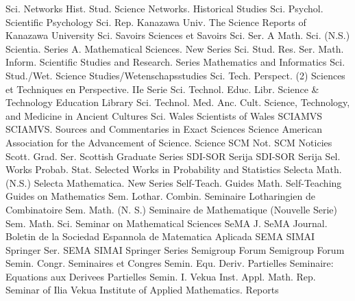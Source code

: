 {Sci. Networks Hist. Stud.}
{Science Networks. Historical Studies}
{Sci. Psychol.}
{Scientific Psychology}
{Sci. Rep. Kanazawa Univ.}
{The Science Reports of Kanazawa University}
{Sci. Savoirs}
{Sciences et Savoirs}
{Sci. Ser. A Math. Sci. (N.S.)}
{Scientia. Series A. Mathematical Sciences. New Series}
{Sci. Stud. Res. Ser. Math. Inform.}
{Scientific Studies and Research. Series Mathematics and Informatics}
{Sci. Stud./Wet.}
{Science Studies/Wetenschapsstudies}
{Sci. Tech. Perspect. (2)}
{Sciences et Techniques en Perspective. IIe Serie}
{Sci. Technol. Educ. Libr.}
{Science & Technology Education Library}
{Sci. Technol. Med. Anc. Cult.}
{Science, Technology, and Medicine in Ancient Cultures}
{Sci. Wales}
{Scientists of Wales}
{SCIAMVS}
{SCIAMVS. Sources and Commentaries in Exact Sciences}
{Science}
{American Association for the Advancement of Science. Science}
{SCM Not.}
{SCM Noticies}
{Scott. Grad. Ser.}
{Scottish Graduate Series}
{SDI-SOR Serija}
{SDI-SOR Serija}
{Sel. Works Probab. Stat.}
{Selected Works in Probability and Statistics}
{Selecta Math. (N.S.)}
{Selecta Mathematica. New Series}
{Self-Teach. Guides Math.}
{Self-Teaching Guides on Mathematics}
{Sem. Lothar. Combin.}
{Seminaire Lotharingien de Combinatoire}
{Sem. Math. (N. S.)}
{Seminaire de Mathematique (Nouvelle Serie)}
{Sem. Math. Sci.}
{Seminar on Mathematical Sciences}
{SeMA J.}
{SeMA Journal. Boletin de la Sociedad Espannola de Matematica Aplicada}
{SEMA SIMAI Springer Ser.}
{SEMA SIMAI Springer Series}
{Semigroup Forum}
{Semigroup Forum}
{Semin. Congr.}
{Seminaires et Congres}
{Semin. Equ. Deriv. Partielles}
{Seminaire: Equations aux Derivees Partielles}
{Semin. I. Vekua Inst. Appl. Math. Rep.}
{Seminar of Ilia Vekua Institute of Applied Mathematics. Reports}
